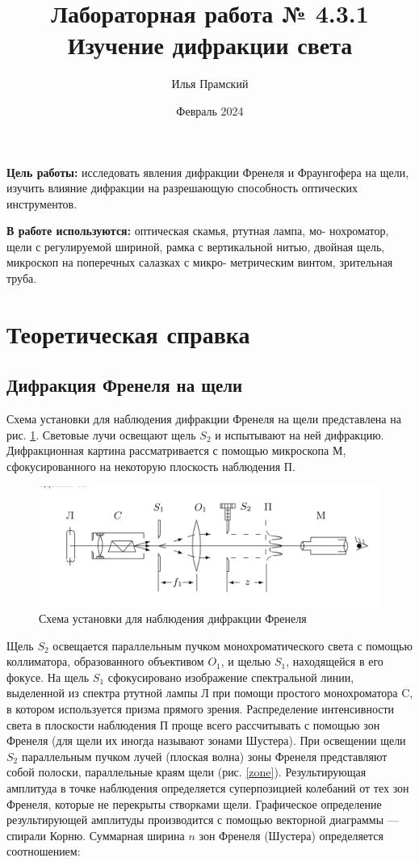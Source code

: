 \documentclass[a4paper,12pt]{article}
\title{Лабораторная работа № 4.3.1\\ Изучение дифракции света}
\author{Илья Прамский}
\date{Февраль 2024}
\begin{document}
\maketitle
\newpage

\textbf{Цель работы:} исследовать явления дифракции Френеля и Фраунгофера на щели, изучить влияние дифракции на разрешающую способность оптических инструментов.


\textbf{В работе используются:} оптическая скамья, ртутная лампа, мо- нохроматор, щели с регулируемой шириной, рамка с вертикальной нитью, двойная щель, микроскоп на поперечных салазках с микро- метрическим винтом, зрительная труба.

\section{Теоретическая справка}
\subsection{Дифракция Френеля на щели}

Схема установки для наблюдения дифракции Френеля на щели представлена на рис. \ref{labA}. Световые лучи освещают щель $ S_2 $ и испытывают на ней дифракцию. Дифракционная картина рассматривается с помощью микроскопа М, сфокусированного на некоторую плоскость наблюдения П.

\begin{figure}[H]
	\centering
	\includegraphics[scale=0.15]{alab.jpeg}
	\caption{Схема установки для наблюдения дифракции Френеля}
	\label{labA}
\end{figure}

Щель $ S_2 $ освещается параллельным пучком монохроматического света с помощью коллиматора, образованного объективом $ O_1 $, и щелью $S_1$, 
находящейся в его фокусе. На щель $ S_1 $ сфокусировано изображение спектральной линии, выделенной из спектра ртутной лампы Л 
при помощи простого монохроматора C, в котором используется призма прямого зрения. 
Распределение интенсивности света в плоскости наблюдения П проще всего рассчитывать с помощью зон Френеля 
(для щели их иногда называют зонами Шустера). При освещении щели $ S_2 $ параллельным пучком лучей (плоская волна) 
зоны Френеля представляют собой полоски, параллельные краям щели (рис. \ref{zone}). 
Результирующая амплитуда в точке наблюдения определяется суперпозицией колебаний от тех зон Френеля, 
которые не перекрыты створками щели. Графическое определение результирующей амплитуды производится с помощью векторной диаграммы --- спирали Корню. 
Суммарная ширина $ n $ зон Френеля (Шустера) определяется соотношением:
\end{document}
